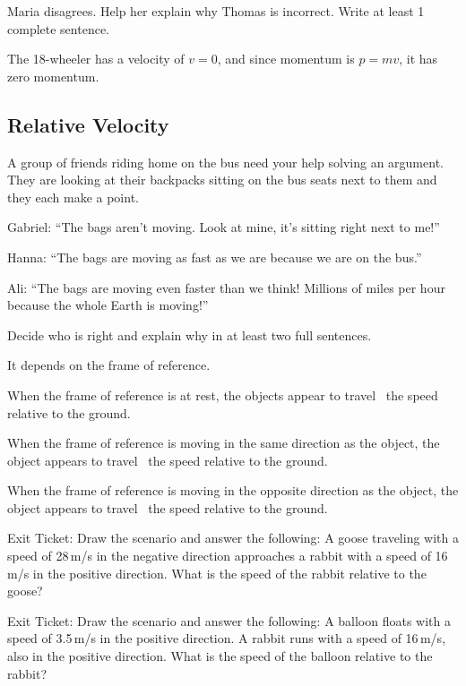 \documentclass[../main-physics-problems.tex]{subfiles}
\begin{document}
\begin{questions}
Maria disagrees. Help her explain why Thomas is incorrect. Write at least 1 complete sentence.

\begin{solution}
    The 18-wheeler has a velocity of $v = 0$, and since momentum is $p = mv$, it has zero momentum. 
\end{solution}

\clearpage
\begin{EnvUplevel}
    \subsection{Relative Velocity}
\end{EnvUplevel}

\question
A group of friends riding home on the bus need your help solving an argument. They are looking at their backpacks sitting on the bus seats next to them and they each make a point. 

Gabriel: ``The bags aren't moving. Look at mine, it’s sitting right next to me!''

Hanna: ``The bags are moving as fast as we are because we are on the bus.''

Ali: ``The bags are moving even faster than we think! Millions of miles per hour because the whole Earth is moving!''

Decide who is right and explain why in at least two full sentences.

\begin{solution}
    It depends on the frame of reference.
\end{solution}


\question
When the frame of reference is at rest, the objects appear to travel \fillin[equal to]\ the speed relative to the ground.

\question
When the frame of reference is moving in the same direction as the object, the object appears to travel \ the speed relative to the ground.

\question
When the frame of reference is moving in the opposite direction as the object, the object appears to travel \ the speed relative to the ground.

\question
Exit Ticket: Draw the scenario and answer the following: A goose traveling with a speed of 28\,m/s in the negative direction approaches a rabbit with a speed of 16\,m/s in the positive direction. What is the speed of the rabbit relative to the goose?

\question
Exit Ticket:  Draw the scenario and answer the following: A balloon floats with a speed of 3.5\,m/s in the positive direction.  A rabbit runs with a speed of 16\,m/s, also in the positive direction.  What is the speed of the balloon relative to the rabbit?



\end{questions}
\end{document}
